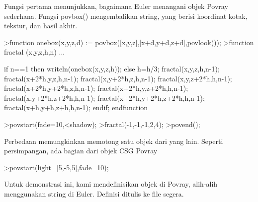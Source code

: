 \documentclass[a4paper,10pt]{article}
\begin{document}
\begin{eulernotebook}
\begin{eulercomment}
\begin{eulercomment}
\begin{eulercomment}
Fungsi pertama menunjukkan, bagaimana Euler menangani objek Povray
sederhana. Fungsi povbox() mengembalikan string, yang berisi koordinat
kotak, tekstur, dan hasil akhir.
\end{eulercomment}
\begin{eulerprompt}
>function onebox(x,y,z,d) := povbox([x,y,z],[x+d,y+d,z+d],povlook());
>function fractal (x,y,z,h,n) ...
\end{eulerprompt}
\begin{eulerudf}
   if n==1 then writeln(onebox(x,y,z,h));
   else
     h=h/3;
     fractal(x,y,z,h,n-1);
     fractal(x+2*h,y,z,h,n-1);
     fractal(x,y+2*h,z,h,n-1);
     fractal(x,y,z+2*h,h,n-1);
     fractal(x+2*h,y+2*h,z,h,n-1);
     fractal(x+2*h,y,z+2*h,h,n-1);
     fractal(x,y+2*h,z+2*h,h,n-1);
     fractal(x+2*h,y+2*h,z+2*h,h,n-1);
     fractal(x+h,y+h,z+h,h,n-1);
   endif;
  endfunction
\end{eulerudf}
\begin{eulerprompt}
>povstart(fade=10,<shadow);
>fractal(-1,-1,-1,2,4);
>povend();
\end{eulerprompt}
\begin{eulercomment}
Perbedaan memungkinkan memotong satu objek dari yang lain. Seperti
persimpangan, ada bagian dari objek CSG Povray
\end{eulercomment}
\begin{eulerprompt}
>povstart(light=[5,-5,5],fade=10);
\end{eulerprompt}
\begin{eulercomment}
Untuk demonstrasi ini, kami mendefinisikan objek di Povray, alih-alih
menggunakan string di Euler. Definisi ditulis ke file segera.


\end{eulercomment}
\end{eulercomment}
\end{eulercomment}
\end{eulernotebook}
\end{document}
